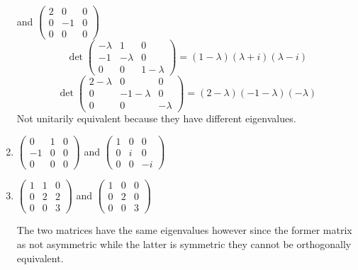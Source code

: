 \begin{enumerate}
  and $\begin{pmatrix} 2 & 0 & 0\\0 & -1 & 0\\ 0 & 0 & 0\end{pmatrix}$
\begin{equation}
\det{
\begin{pmatrix}
-\lambda & 1 & 0\\
-1 & -\lambda & 0\\
0 & 0 & 1-\lambda
\end{pmatrix}
} = (1-\lambda)(\lambda+i)(\lambda-i)
\end{equation}
\begin{equation}
\det{
\begin{pmatrix}
2-\lambda & 0 & 0\\
0 & -1 -\lambda & 0\\
0 & 0 & -\lambda 
\end{pmatrix}
} = (2-\lambda)(-1-\lambda)(-\lambda)
\end{equation}
Not unitarily equivalent  because they have different eigenvalues.
\item $\begin{pmatrix}
0 & 1 & 0\\
-1 & 0 & 0\\
0 & 0 & 0
\end{pmatrix}$ and
$\begin{pmatrix}
1 & 0 & 0\\
0 & i & 0\\
0 & 0 & -i
\end{pmatrix}$
\item $\begin{pmatrix}
1 & 1 & 0\\
0 & 2 & 2\\
0 & 0 & 3
  \end{pmatrix}$
and 
$
\begin{pmatrix}
1 & 0 & 0\\
0 & 2 & 0\\
0 & 0 & 3
\end{pmatrix}$

The two matrices have the same eigenvalues however since the former
matrix as not asymmetric while the latter is symmetric they cannot be
orthogonally equivalent.
\end{enumerate}
